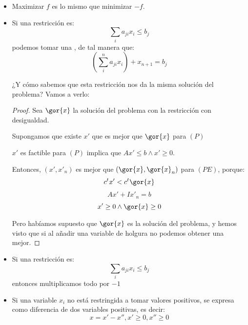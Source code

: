 \begin{itemize}
	\item Maximizar $f$ es lo mismo que minimizar $-f$.
	\item Si una restricción es: \[\sum_i a_{ji}x_i \leq b_j\] podemos tomar una , de tal manera que:
	\[\left(\sum_i^n a_{ji}x_i\right) + x_{n+1} = b_j\]

	¿Y cómo sabemos que esta restricción nos da la misma solución del problema? Vamos a verlo:

	\begin{proof}
		Sea $\gor{x}$ la solución del problema con la restricción con desigualdad.

		Supongamos que existe $x'$ que es mejor que $\gor{x}$ para $(P)$

		$x'$ es factible para $(P)$ implica que $Ax'\leq b \wedge x'\geq 0$. 

		Entonces, $(x',x'_n)$ es mejor que $(\gor{x},\gor{x}_n)$ para $(PE)$, porque:
		\[c^tx'<c^t\gor{x}\]
		\[Ax'+Ix'_n = b\]
		\[x'\geq 0 \wedge \gor{x}\geq 0\]

		Pero habíamos supuesto que $\gor{x}$ es la solución del problema, y hemos visto que si al añadir una variable de holgura no podemos obtener una mejor.
	\end{proof}
	\item Si una restricción es: \[\sum_i a_{ji}x_i \leq b_j\] entonces multiplicamos todo por $-1$
	\item Si una variable $x_i$ no está restringida a tomar valores positivos, se expresa como diferencia de dos variables positivas, es decir:\[x=x'−x'', x'≥0,x''≥0\]

\end{itemize}



